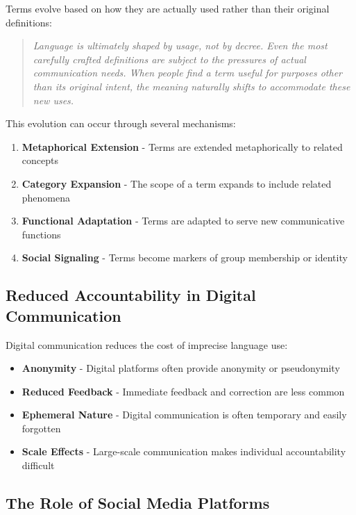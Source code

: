 \documentclass[11pt]{article}
\begin{document}
Terms evolve based on how they are actually used rather than their original definitions:

\begin{quote}
\emph{Language is ultimately shaped by usage, not by decree. Even the most carefully crafted definitions are subject to the pressures of actual communication needs. When people find a term useful for purposes other than its original intent, the meaning naturally shifts to accommodate these new uses.}
\end{quote}

This evolution can occur through several mechanisms:

\begin{enumerate}
\item \textbf{Metaphorical Extension} - Terms are extended metaphorically to related concepts
\item \textbf{Category Expansion} - The scope of a term expands to include related phenomena
\item \textbf{Functional Adaptation} - Terms are adapted to serve new communicative functions
\item \textbf{Social Signaling} - Terms become markers of group membership or identity
\end{enumerate}

\subsection{Reduced Accountability in Digital Communication}

Digital communication reduces the cost of imprecise language use:

\begin{itemize}
\item \textbf{Anonymity} - Digital platforms often provide anonymity or pseudonymity
\item \textbf{Reduced Feedback} - Immediate feedback and correction are less common
\item \textbf{Ephemeral Nature} - Digital communication is often temporary and easily forgotten
\item \textbf{Scale Effects} - Large-scale communication makes individual accountability difficult
\end{itemize}

\subsection{The Role of Social Media Platforms}
\end{document}
